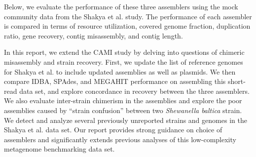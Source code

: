 \documentclass[10pt,a4paper,twocolumn]{article}
\begin{document}



Below, we evaluate the performance of these three assemblers using the
mock community data from the Shakya et al. study.
The performance of each assembler is compared in terms
of resource utilization, covered genome fraction, duplication ratio, gene
recovery, contig misassembly, and contig length.


In this report, we extend the CAMI study by delving into questions of
chimeric misassembly and strain recovery.  First, we update the list
of reference genomes for Shakya et al.  to include updated assemblies
as well as plasmids. We then compare IDBA, SPAdes, and MEGAHIT
performance on assembling this short-read data set, and explore
concordance in recovery between the three assemblers.  We also evaluate
inter-strain chimerism in the assemblies and explore the poor
assemblies caused by ``strain confusion'' between two {\em Shewanella
  baltica} strain.  We detect and analyze several previously
unreported strains and genomes in the Shakya et al. data set. Our
report provides strong guidance on choice of assemblers and
significantly extends previous analyses of this low-complexity
metagenome benchmarking data set.

\end{document}
